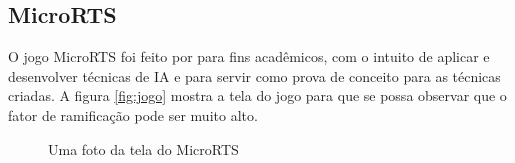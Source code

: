\subsection{MicroRTS} 
O jogo MicroRTS foi feito por \cite{ontanon2013combinatorial} para fins acadêmicos, com o intuito de aplicar e desenvolver técnicas de IA e para servir como prova de conceito para as técnicas criadas.  
A figura \ref{fig:jogo} mostra a tela do jogo para que se possa observar que o fator de ramificação pode ser muito alto.

\begin{figure}[ht]
	\centering
	\caption{Uma foto da tela do MicroRTS}
	\label{fig:microrts}
\end{figure} 
